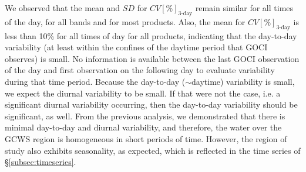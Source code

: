 \documentclass[remotesensing,article,submit,moreauthors,pdftex,10pt,a4paper]{Definitions/mdpi}
\begin{document}
We observed that the mean and $SD$ for $CV[\%]_\text{3-day}$ remain similar for all times of the day, for all bands and for most products. Also, the mean for $CV[\%]_\text{3-day}$ is less than 10\% for all times of day for all products, indicating that the day-to-day variability (at least within the confines of the daytime period that GOCI observes) is small. No information is available between the last GOCI observation of the day and first observation on the following day to evaluate variability during that time period.  Because the day-to-day ($\sim$daytime) variability is small, we expect the diurnal variability to be small. If that were not the case, i.e. a significant diurnal variability occurring, then the day-to-day variability should be significant, as well. From the previous analysis, we demonstrated that there is minimal day-to-day and diurnal variability, and therefore, the water over the GCWS region is homogeneous in short periods of time. However, the region of study also exhibits seasonality, as expected, which is reflected in the time series of \S\ref{subsec:timeseries}. 
\end{document}

